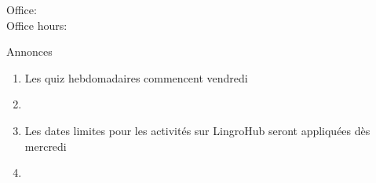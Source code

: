 \documentclass{beamer}
\subtitle[À la fac et articles]{À la fac et les articles}
\begin{document}
  \begin{frame}
    \titlepage
    \tiny{Office: \\
          Office hours: }
  \end{frame}

  \begin{frame}{Annonces }
    \begin{enumerate}
      \item Les quiz hebdomadaires commencent vendredi
      \item[] 
      \item Les dates limites pour les activités sur LingroHub seront appliquées dès mercredi
      \item[] 
    \end{enumerate}
  \end{frame}

\end{document}
